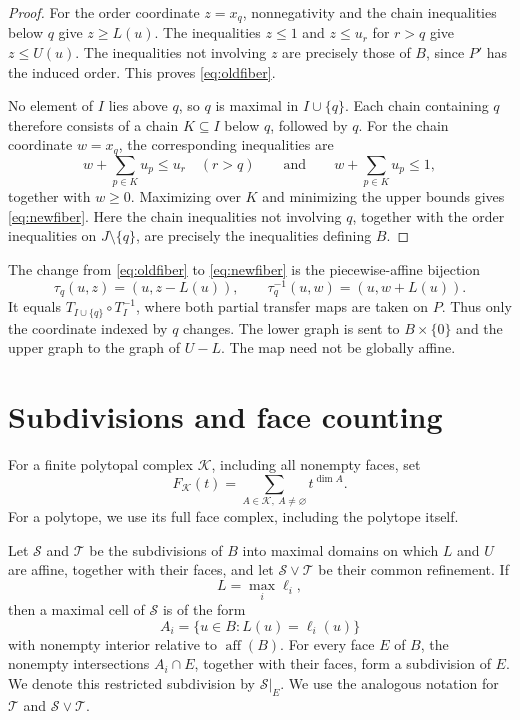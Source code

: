 \documentclass[a4paper,12pt]{amsart}
\theoremstyle{definition}
\theoremstyle{remark}
\begin{document}
\begin{proof}
For the order coordinate $z=x_q$, nonnegativity and the chain inequalities below $q$ give $z\geq L(u)$.
The inequalities $z\leq1$ and $z\leq u_r$ for $r>q$ give $z\leq U(u)$.
The inequalities not involving $z$ are precisely those of $B$, since $P'$ has the induced order.
This proves \eqref{eq:oldfiber}.

No element of $I$ lies above $q$, so $q$ is maximal in $I\cup\{q\}$.
Each chain containing $q$ therefore consists of a chain $K\subseteq I$ below $q$, followed by $q$.
For the chain coordinate $w=x_q$, the corresponding inequalities are
\[
 w+\sum_{p\in K}u_p\leq u_r\quad(r>q)
 \qquad\text{and}\qquad
 w+\sum_{p\in K}u_p\leq1,
\]
together with $w\geq0$.
Maximizing over $K$ and minimizing the upper bounds gives \eqref{eq:newfiber}.
Here the chain inequalities not involving $q$, together with the order inequalities on $J\setminus\{q\}$, are precisely the inequalities defining $B$.
\end{proof}

The change from \eqref{eq:oldfiber} to \eqref{eq:newfiber} is the piecewise-affine bijection
\[
 \tau_q(u,z)=(u,z-L(u)),\qquad
 \tau_q^{-1}(u,w)=(u,w+L(u)).
\]
It equals $T_{I\cup\{q\}}\circ T_I^{-1}$, where both partial transfer maps are taken on $P$.
Thus only the coordinate indexed by $q$ changes.
The lower graph is sent to $B\times\{0\}$ and the upper graph to the graph of $U-L$.
The map need not be globally affine.

\section{Subdivisions and face counting}\label{sec4}

For a finite polytopal complex $\mathcal K$, including all nonempty faces, set
\[
 F_{\mathcal K}(t)=  \sum_{A\in\mathcal K,\ A\neq\varnothing}t^{\dim A}.
\]
For a polytope, we use its full face complex, including the polytope itself.

Let $\mathcal S$ and $\mathcal T$ be the subdivisions of $B$ into maximal domains on which $L$ and $U$ are affine, together with their faces, and let $\mathcal S\vee\mathcal T$ be their common refinement.
If
\[
 L=\max_i\ell_i,
\]
then a maximal cell of $\mathcal S$ is of the form
\[
 A_i=\{u\in B:L(u)=\ell_i(u)\}
\]
with nonempty interior relative to $\operatorname{aff}(B)$.
For every face $E$ of $B$, the nonempty intersections $A_i\cap E$, together with their faces, form a subdivision of $E$.
We denote this restricted subdivision by $\mathcal S|_E$.
We use the analogous notation for $\mathcal T$ and $\mathcal S\vee\mathcal T$.
\end{document}
